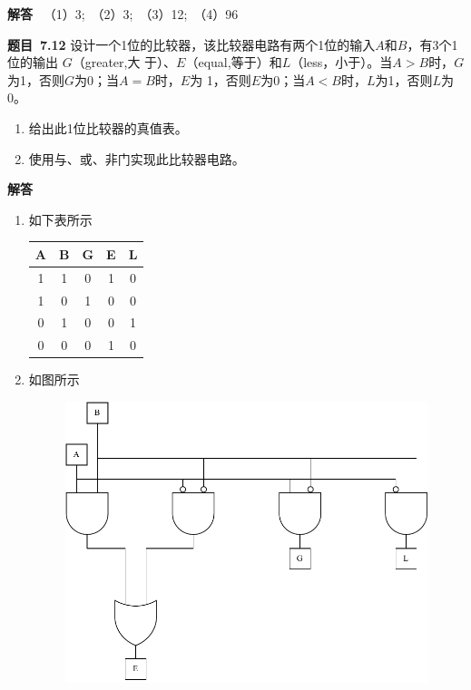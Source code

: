 \documentclass[10pt,a4paper,UTF8]{ctexart}
\newcommand{\problemname}{待定义}
\newenvironment{problem}{\begin{shaded}\par\noindent\textbf{题目\  \problemname}}{\end{shaded}\par}
\newenvironment{solution}{\par\noindent\textbf{解答}\ }{\par}
\begin{document}
\begin{solution}
	（1）3;\ （2）3;\ （3）12;\ （4）96
\end{solution}


\renewcommand{\problemname}{7.12}
\begin{problem}
	设计一个1位的比较器，该比较器电路有两个1位的输入$A$和$B$，有3个1位的输出 $G$（greater,大
	于）、$E$（equal,等于）和$L$（less，小于）。当$A>B$时，$G$为1，否则$G$为0；当$A=B$时，$E$为
	1，否则$E$为0；当$A<B$时，$L$为1，否则$L$为0。
	\begin{enumerate}[(1)]
		\item 给出此1位比较器的真值表。
		\item 使用与、或、非门实现此比较器电路。
	\end{enumerate}
\end{problem}

\begin{solution}
	\begin{enumerate}[(1)]
		\item 如下表所示
		\begin{table}[H]
			\centering
			\begin{tabular}{|c|c|c|c|c|}
			\hline
			A & B & G & E & L \\ \hline
			1 & 1 & 0 & 1 & 0 \\ \hline
			1 & 0 & 1 & 0 & 0 \\ \hline
			0 & 1 & 0 & 0 & 1 \\ \hline
			0 & 0 & 0 & 1 & 0 \\ \hline
			\end{tabular}
		\end{table}
		\item 如图所示
		\begin{figure}[H]
			\centering
			\includegraphics[scale=0.6]{img/7.12.pdf}
		\end{figure}
	\end{enumerate}

\end{solution}
\end{document}
